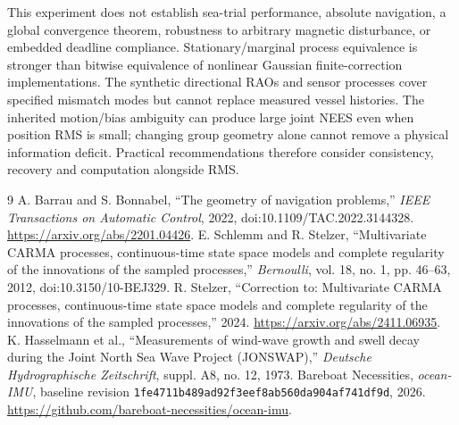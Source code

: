 \documentclass[conference]{IEEEtran}
\begin{document}
This experiment does not establish sea-trial performance, absolute navigation,
a global convergence theorem, robustness to arbitrary magnetic disturbance,
or embedded deadline compliance. Stationary/marginal process equivalence is
stronger than bitwise equivalence of nonlinear Gaussian finite-correction
implementations. The synthetic directional RAOs and sensor processes cover
specified mismatch modes but cannot replace measured vessel histories.
The inherited motion/bias ambiguity can produce large joint NEES even when
position RMS is small; changing group geometry alone cannot remove a physical
information deficit. Practical recommendations therefore consider consistency,
recovery and computation alongside RMS.
\Recommendation

\begin{thebibliography}{9}
 A. Barrau and S. Bonnabel, ``The geometry of navigation
problems,'' \emph{IEEE Transactions on Automatic Control}, 2022,
doi:10.1109/TAC.2022.3144328. \url{https://arxiv.org/abs/2201.04426}.
 E. Schlemm and R. Stelzer, ``Multivariate CARMA processes,
continuous-time state space models and complete regularity of the innovations
of the sampled processes,'' \emph{Bernoulli}, vol. 18, no. 1, pp. 46--63,
2012, doi:10.3150/10-BEJ329.
 R. Stelzer, ``Correction to: Multivariate CARMA processes,
continuous-time state space models and complete regularity of the innovations
of the sampled processes,'' 2024. \url{https://arxiv.org/abs/2411.06935}.
 K. Hasselmann et al., ``Measurements of wind-wave growth
and swell decay during the Joint North Sea Wave Project (JONSWAP),''
\emph{Deutsche Hydrographische Zeitschrift}, suppl. A8, no. 12, 1973.
 Bareboat Necessities, \emph{ocean-IMU}, baseline revision
\texttt{1fe4711b489ad92f3eef8ab560da904af741df9d}, 2026.
\url{https://github.com/bareboat-necessities/ocean-imu}.
\end{thebibliography}
\end{document}
